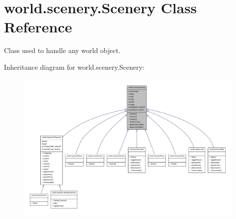 \hypertarget{classworld_1_1scenery_1_1_scenery}{\section{world.\-scenery.\-Scenery Class Reference}
\label{classworld_1_1scenery_1_1_scenery}
}


Class used to handle any world object.  




Inheritance diagram for world.\-scenery.\-Scenery\-:
\nopagebreak
\begin{figure}[H]
\begin{center}
\leavevmode
\includegraphics[width=350pt]{classworld_1_1scenery_1_1_scenery__inherit__graph}
\end{center}
\end{figure}


